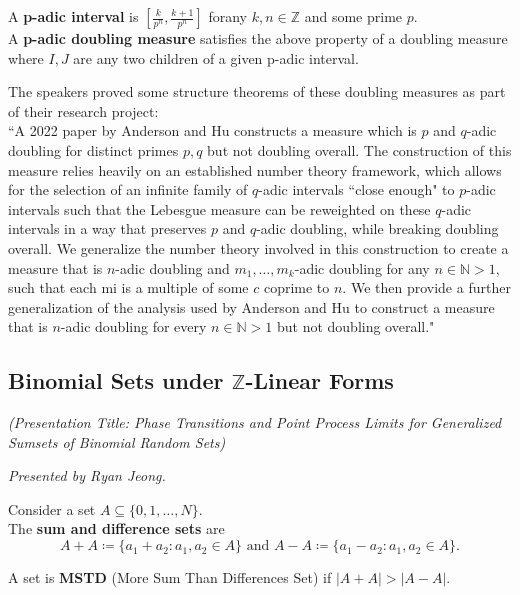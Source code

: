 \documentclass[12pt]{amsart}
\begin{document}
\begin{definition}[p-adic]
A \textbf{p-adic interval} is $[\frac{k}{p^n}, \frac{k+1}{p^n}]$ forany $k, n \in \mathbb{Z}$ and some prime $p$. \\

A \textbf{p-adic doubling measure} satisfies the above property of a doubling measure where $I, J$ are any two children of a given p-adic interval.
\end{definition}

\begin{result*}
The speakers proved some structure theorems of these doubling measures as part of their research project: \\

``A 2022 paper by Anderson and Hu constructs a measure which is $p$ and $q$-adic doubling for distinct primes $p, q$ but not
doubling overall. The construction of this measure relies heavily on an established number
theory framework, which allows for the selection of an infinite family of $q$-adic intervals ``close
enough" to $p$-adic intervals such that the Lebesgue measure can be reweighted on these $q$-adic
intervals in a way that preserves $p$ and $q$-adic doubling, while breaking doubling overall. We
generalize the number theory involved in this construction to create a measure that is $n$-adic
doubling and $m_1, \dots, m_k$-adic doubling for any $n \in \mathbb{N} > 1$, such that each mi
is a multiple of some $c$ coprime to $n$. We then provide a further generalization of the analysis used by Anderson
and Hu to construct a measure that is $n$-adic doubling for every $n \in \mathbb{N} > 1$ but not doubling
overall."
\end{result*}

\newpage

\subsection{Binomial Sets under $\mathbb{Z}$-Linear Forms}

\textit{(Presentation Title: Phase Transitions and Point Process Limits for Generalized Sumsets of Binomial Random Sets)}

\textit{}

\vspace{0.25cm}
\textit{Presented by Ryan Jeong.}

\begin{definition}[MSTD]
Consider a set $A \subseteq \{0, 1, \dots, N\}.$ \\

The \textbf{sum and difference sets} are \[ A + A \coloneqq \{a_1 + a_2: a_1, a_2 \in A \} \text { and } A - A \coloneqq \{a_1 - a_2 : a_1, a_2 \in A \}.\] 

A set is \textbf{MSTD} (More Sum Than Differences Set) if $|A+A| > |A-A|.$
\end{definition}
\end{document}
